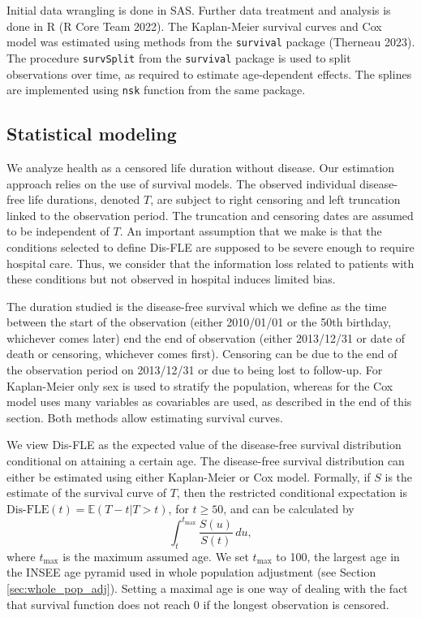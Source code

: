 \documentclass{article}
\begin{document}
Initial data wrangling is done in SAS. Further data treatment and
analysis is done in R (R Core Team 2022). The Kaplan-Meier survival
curves and Cox model was estimated using methods from the
\texttt{survival} package (Therneau 2023). The procedure
\texttt{survSplit} from the \texttt{survival} package is used to split
observations over time, as required to estimate age-dependent effects.
The splines are implemented using \texttt{nsk} function from the same
package.

\hypertarget{statistical-modeling}{%
\subsection{Statistical modeling}\label{statistical-modeling}}

We analyze health as a censored life duration without disease. Our
estimation approach relies on the use of survival models. The observed
individual disease-free life durations, denoted \(T\), are subject to
right censoring and left truncation linked to the observation period.
The truncation and censoring dates are assumed to be independent of
\(T\). An important assumption that we make is that the conditions
selected to define Dis-FLE are supposed to be severe enough to require
hospital care. Thus, we consider that the information loss related to
patients with these conditions but not observed in hospital induces
limited bias.

The duration studied is the disease-free survival which we define as the
time between the start of the observation (either 2010/01/01 or the 50th
birthday, whichever comes later) end the end of observation (either
2013/12/31 or date of death or censoring, whichever comes first).
Censoring can be due to the end of the observation period on 2013/12/31
or due to being lost to follow-up. For Kaplan-Meier only sex is used to
stratify the population, whereas for the Cox model uses many variables
as covariables are used, as described in the end of this section. Both
methods allow estimating survival curves.

We view Dis-FLE as the expected value of the disease-free survival
distribution conditional on attaining a certain age. The disease-free
survival distribution can either be estimated using either Kaplan-Meier
or Cox model. Formally, if \(S\) is the estimate of the survival curve
of \(T\), then the restricted conditional expectation is
\(\text{Dis-FLE}(t) = \mathbb{E}(T-t | T > t)\), for \(t \geq 50\), and
can be calculated by \[
\int_{t}^{t_{\text{max}}} \frac{S(u)}{S(t)}\, du,
\] where \(t_{\text{max}}\) is the maximum assumed age. We set
\(t_{\text{max}}\) to 100, the largest age in the INSEE age pyramid used
in whole population adjustment (see Section \ref{sec:whole_pop_adj}).
Setting a maximal age is one way of dealing with the fact that survival
function does not reach 0 if the longest observation is censored.
\end{document}
